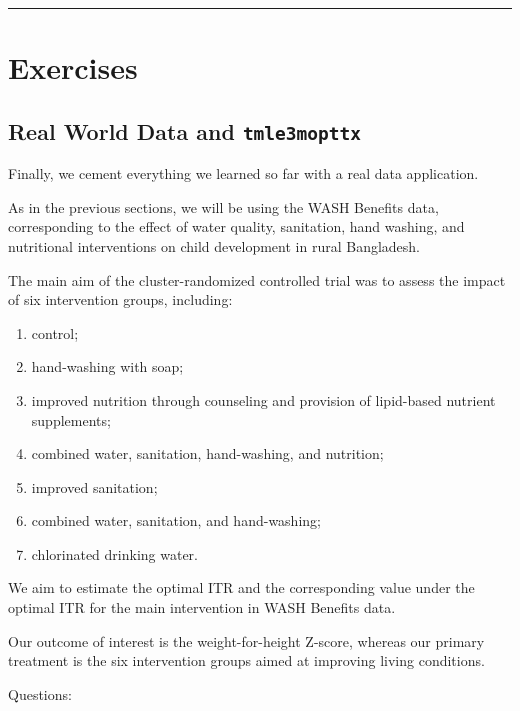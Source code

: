 \documentclass[
  12pt, krantz2,
]{krantz}
\theoremstyle{definition}
\theoremstyle{definition}
\theoremstyle{definition}
\newcommand{\1}{\mathbbm{1}}
\begin{document}
\begin{center}\rule{0.5\linewidth}{0.5pt}\end{center}

\hypertarget{exercises-2}{%
\section{Exercises}\label{exercises-2}}

\hypertarget{real-world-data-and-tmle3mopttx}{%
\subsection{\texorpdfstring{Real World Data and \texttt{tmle3mopttx}}{Real World Data and tmle3mopttx}}\label{real-world-data-and-tmle3mopttx}}

Finally, we cement everything we learned so far with a real data application.

As in the previous sections, we will be using the WASH Benefits data,
corresponding to the effect of water quality, sanitation, hand washing, and
nutritional interventions on child development in rural Bangladesh.

The main aim of the cluster-randomized controlled trial was to assess the
impact of six intervention groups, including:

\begin{enumerate}
\def\labelenumi{\arabic{enumi}.}
\item
  control;
\item
  hand-washing with soap;
\item
  improved nutrition through counseling and provision of lipid-based nutrient
  supplements;
\item
  combined water, sanitation, hand-washing, and nutrition;
\item
  improved sanitation;
\item
  combined water, sanitation, and hand-washing;
\item
  chlorinated drinking water.
\end{enumerate}

We aim to estimate the optimal ITR and the corresponding value under the optimal
ITR for the main intervention in WASH Benefits data.

Our outcome of interest is the weight-for-height Z-score, whereas our primary
treatment is the six intervention groups aimed at improving living conditions.

Questions:
\end{document}
